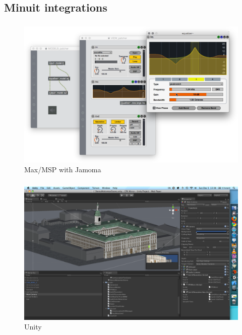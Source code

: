 \documentclass[12pt,t]{beamer}
\makeatletter
\newcommand*{\currentname}{\@currentlabelname}
\makeatother
\begin{document}
\subsection{Minuit integrations}
\begin{frame}
    \frametitle{\currentname}
    \centering
    \begin{figure}
        \includegraphics[scale=0.2]{images/jamoma.png}
        \caption{Max/MSP with Jamoma}
    \end{figure}
\end{frame}

\begin{frame}
    \frametitle{\currentname}
    \centering
    \begin{figure}
        \includegraphics[scale=0.2]{images/unity.png}
        \caption{Unity}
    \end{figure}
\end{frame}
\end{document}
